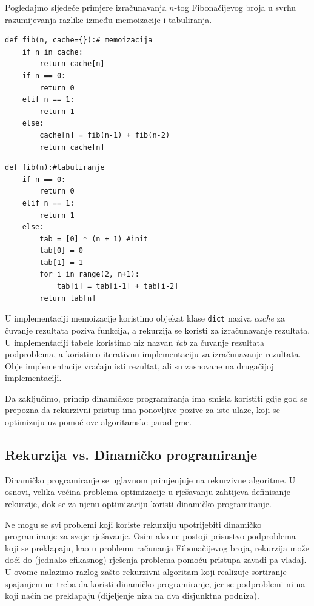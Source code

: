 Pogledajmo sljedeće primjere izračunavanja $n$-tog Fibonačijevog broja u svrhu razumijevanja razlike između memoizacije i tabuliranja.   

\begin{verbatim}
def fib(n, cache={}):# memoizacija
	if n in cache:
		return cache[n]
	if n == 0:
		return 0
	elif n == 1:
		return 1
	else:
		cache[n] = fib(n-1) + fib(n-2)
		return cache[n]
\end{verbatim}

\begin{verbatim}  
def fib(n):#tabuliranje
	if n == 0:
		return 0
	elif n == 1:
		return 1
	else:
		tab = [0] * (n + 1) #init
		tab[0] = 0
		tab[1] = 1
		for i in range(2, n+1):
			tab[i] = tab[i-1] + tab[i-2]
		return tab[n]
\end{verbatim}
U implementaciji memoizacije koristimo objekat klase \texttt{dict} naziva \textit{cache} za čuvanje rezultata poziva funkcija, a rekurzija se koristi za izračunavanje rezultata. U implementaciji tabele koristimo niz nazvan \textit{tab} za čuvanje rezultata podproblema, a koristimo iterativnu impleme\-ntaciju za izračunava\-nje rezultata. Obje implementacije vraćaju isti rezultat, ali su zasnovane na drugačijoj implementaciji. %

Da zaključimo, princip dinamičkog programiranja ima smisla koristiti gdje god se prepozna da rekurzivni pristup ima ponovljive pozive za iste ulaze, koji se optimizuju uz pomoć ove algoritamske paradigme.

\subsection{Rekurzija vs. Dinamičko programiranje}


Dinamičko programiranje se uglavnom primjenjuje na rekurzivne algori\-tme.  U  osnovi, velika većina problema optimizacije u rješavanju zahtijeva definisanje rekurzije, dok se za njenu  optimizaciju koristi dinamičko progra\-miranje.

Ne mogu se svi problemi koji koriste rekurziju upotrijebiti dinamičko programiranje za svoje rješavanje. Osim ako ne postoji prisustvo podproble\-ma koji se preklapaju,  kao u problemu računanja Fibonačijevog broja, rekurzija može doći do (jednako efikasnog) rješenja problema pomoću pristu\-pa zavadi pa vladaj. U ovome nalazimo  razlog zašto rekurzivni algoritam koji realizuje  sortiranje spajanjem ne treba da koristi dinamičko programi\-ranje, jer se podproblemi ni na koji način ne preklapaju (dijeljenje niza na dva disjunktna podniza).


